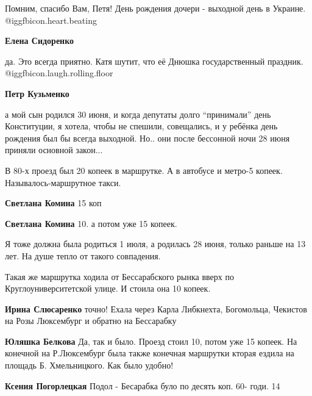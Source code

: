 \begin{itemize}

Помним, спасибо Вам, Петя! День рождения дочери - выходной день в Украине. @igg{fbicon.heart.beating} 

\begin{itemize} %
\textbf{Елена Сидоренко} 

да. Это всегда приятно. Катя шутит, что её Днюшка государственный праздник.
@igg{fbicon.laugh.rolling.floor} 

\textbf{Петр Кузьменко} 

а мой сын родился 30 июня, и когда депутаты долго \enquote{принимали} день Конституции,
я хотела, чтобы не спешили, совещались, и у ребёнка день рождения был бы всегда
выходной. Но.. они после бессонной ночи 28 июня приняли основной закон...

\end{itemize} %


В 80-х проезд был 20 копеек в маршрутке. А в автобусе и метро-5
копеек. Называлось-маршрутное такси.

\begin{itemize} %
\textbf{Светлана Комина} 15 коп

\textbf{Светлана Комина} 10. а потом уже 15 копеек.
\end{itemize} %


Я тоже должна была родиться 1 июля, а родилась 28 июня, только раньше на 13
лет. На душе тепло от такого совпадения.



Такая же маршрутка ходила от Бессарабского рынка вверх по Круглоуниверситетской
улице. И стоила она 10 копеек.

\begin{itemize} %
\textbf{Ирина Слюсаренко} точно! Ехала через Карла Либкнехта, Богомольца, Чекистов на Розы Люксембург и обратно на Бессарабку

\begin{itemize} %
\textbf{Юляшка Белкова} Да, так и было. Проезд стоил 10, потом уже 15 копеек. На конечной на Р.Люксембург была также конечная маршрутки кторая ездила на площадь Б. Хмельницкого. Как было удобно!

\textbf{Ксения Погорлецкая} Подол - Бесарабка було по десять коп. 60- годи. 14
\end{itemize} %


\end{itemize}
\end{itemize}
